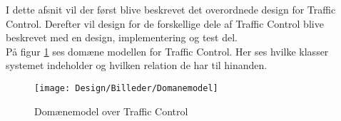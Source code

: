 I dette afsnit vil der først blive beskrevet det overordnede design for Traffic Control. Derefter vil design for de forskellige dele af Traffic Control blive beskrevet med en design, implementering og test del. \\
På figur \ref{fig:Domane model} ses domæne modellen for Traffic Control. Her ses hvilke klasser systemet indeholder og hvilken relation de har til hinanden.

\begin{figure}[H]
	\centering
	\texttt{[image: Design/Billeder/Domanemodel]}
	\caption{Domænemodel over Traffic Control}
	\label{fig:Domane model}
\end{figure}

\pagebreak